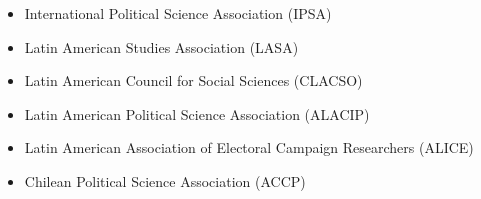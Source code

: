 






\begin{cventries}

\begin{itemize}
\item{\small International Political Science Association (IPSA)}
\item{\small Latin American Studies Association (LASA)}
\item{\small Latin American Council for Social Sciences (CLACSO)}
\item{\small Latin American Political Science Association (ALACIP)}
\item{\small Latin American Association of Electoral Campaign Researchers (ALICE)}
\item{\small Chilean Political Science Association (ACCP)}
\end{itemize}

\vspace{1mm}
\end{cventries}
